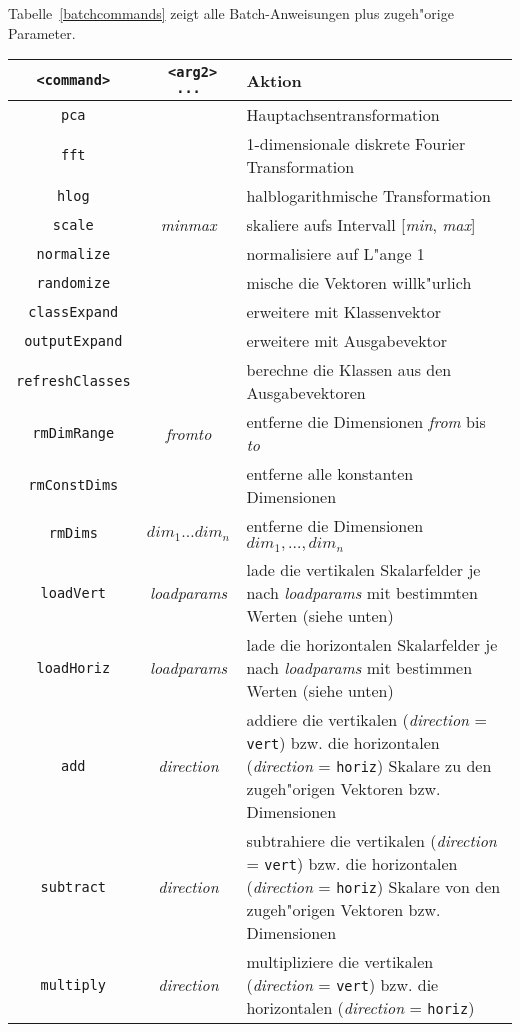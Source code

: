 Tabelle~\ref{batchcommands} zeigt alle Batch-Anweisungen plus zugeh"orige
Parameter.

\begin{table}
\begin{tabular}{c|c|p{7.5cm}}
{\tt <command>} & {\tt <arg1> <arg2> ...} & {\bf Aktion} \\ \hline
{\tt pca} & & Hauptachsentransformation \\
{\tt fft} & & 1-dimensionale diskrete Fourier Trans\-for\-ma\-tion \\
{\tt hlog} & & halblogarithmische Transformation \\
{\tt scale} & {\it min\quad max} & skaliere aufs Intervall 
[{\it min}, {\it max}] \\
{\tt normalize} & & normalisiere auf L"ange 1 \\
{\tt randomize} & & mische die Vektoren willk"urlich \\
{\tt classExpand} & & erweitere mit Klassenvektor \\
{\tt outputExpand} & & erweitere mit Ausgabevektor \\
{\tt refreshClasses} & & berechne die Klassen aus den
Aus\-ga\-be\-vek\-toren \\
{\tt rmDimRange} & {\it from\quad to} & entferne die Dimensionen {\it from} 
bis {\it to} \\
{\tt rmConstDims} & & entferne alle konstanten Dimensionen \\
{\tt rmDims} & $dim_1 \ldots dim_n$ & entferne die Dimensionen 
$dim_1, \ldots, dim_n$ \\ 
{\tt loadVert} & {\it loadparams} & lade die vertikalen Skalarfelder 
je nach {\it loadparams} mit bestimmten Werten (siehe unten) \\
{\tt loadHoriz} & {\it loadparams} & lade die horizontalen Skalarfelder 
je nach {\it loadparams} mit bestimmen Werten (siehe unten) \\
{\tt add} & {\it direction} & addiere die vertikalen 
({\it direction} = {\tt vert})
bzw. die horizontalen ({\it direction} = {\tt horiz}) Skalare zu den 
zugeh"origen Vektoren bzw. Dimensionen \\
{\tt subtract} & {\it direction} & subtrahiere die vertikalen 
({\it direction} = {\tt vert}) bzw. die horizontalen 
({\it direction} = {\tt horiz}) 
Skalare von den zugeh"origen Vektoren bzw. Dimensionen \\
{\tt multiply} & {\it direction} & multipliziere die vertikalen 
({\it direction} = {\tt vert}) bzw. die horizontalen 
({\it direction} = {\tt horiz}) 

\end{tabular}
\end{table}

